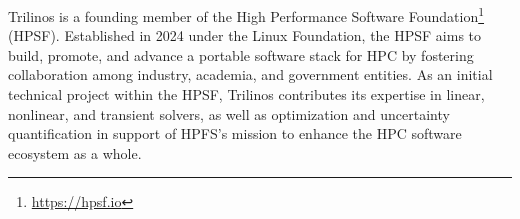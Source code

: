 Trilinos is a founding member of the High Performance Software Foundation\footnote{\url{https://hpsf.io}} (HPSF).
Established in 2024 under the Linux Foundation,
the HPSF aims to build, promote, and advance a portable software stack for HPC by fostering collaboration among industry, academia, and government entities.
As an initial technical project within the HPSF, Trilinos contributes its expertise in linear, nonlinear, and transient solvers,
as well as optimization and uncertainty quantification in support of HPFS’s mission to enhance the HPC software ecosystem as a whole.
